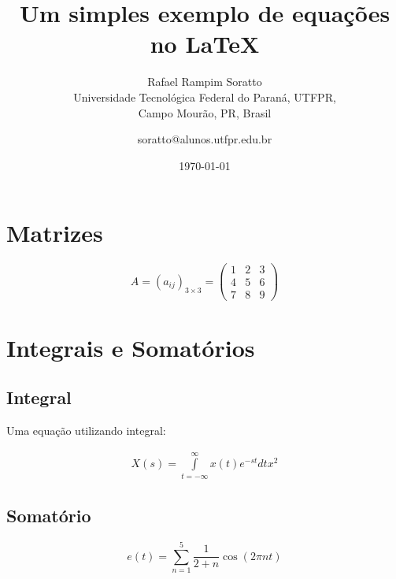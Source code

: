 \documentclass{article}
\title{Um simples exemplo de equações no \LaTeX}
\author{Rafael Rampim Soratto  \\
	Universidade Tecnológica Federal do Paraná, UTFPR,\\ Campo Mourão, PR, Brasil \\
	\and 
	\small{soratto@alunos.utfpr.edu.br}
}
\date{\today}
\begin{document}
    \section{Matrizes}
    $$
        A=(a_{ij})_{3\times 3}=\left(\begin{array}{ccc}
        1& 2 & 3 \\
        4& 5 & 6\\
        7& 8 & 9
        \end{array} \right)
    $$

	\section{Integrais e Somatórios}
	\subsection{Integral}
	
	Uma equação utilizando integral: 
	
	\begin{eqnarray}
    X(s) = \int\limits_{t = -\infty}^{\infty} x(t) e^{-st}
    dt x^2
    \label{eq:Xs}
    \end{eqnarray}

    \subsection{Somatório}
    
    \begin{equation}
     e(t) = 
     \sum_{n=1}^{5} \frac{1}{2+n} \cos(2 \pi nt)
    \end{equation}
\end{document}
